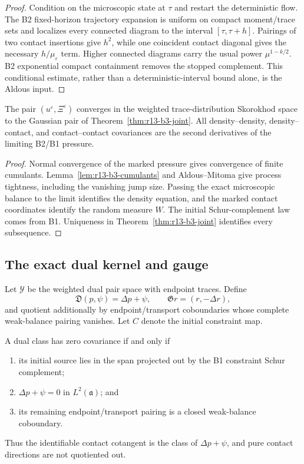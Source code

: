 \begin{proof}
Condition on the microscopic state at $\tau$ and restart the deterministic
flow.  The B2 fixed-horizon trajectory expansion is uniform on compact
moment/trace sets and localizes every connected diagram to the interval
$[\tau,\tau+h]$.  Pairings of two contact insertions give $h^2$, while one
coincident contact diagonal gives the necessary $h/\mu_\varepsilon$ term.
Higher connected diagrams carry the usual power
$\mu^{1-k/2}$.  B2 exponential compact containment removes the stopped
complement.  This conditional estimate, rather than a deterministic-interval
bound alone, is the Aldous input.
\end{proof}

\begin{theorem}
\label{thm:r13-b3-process}
The pair $(u^\varepsilon,\Xi^\varepsilon)$ converges in the weighted
trace-distribution Skorokhod space to the Gaussian pair of
Theorem~\ref{thm:r13-b3-joint}.  All density--density, density--contact, and
contact--contact covariances are the second derivatives of the limiting B2/B1
pressure.
\end{theorem}

\begin{proof}
Normal convergence of the marked pressure gives convergence of finite
cumulants.  Lemma~\ref{lem:r13-b3-cumulants} and Aldous--Mitoma give process
tightness, including the vanishing jump size.  Passing the exact microscopic
balance to the limit identifies the density equation, and the marked contact
coordinates identify the random measure $W$.  The initial Schur-complement
law comes from B1.  Uniqueness in
Theorem~\ref{thm:r13-b3-joint} identifies every subsequence.
\end{proof}

\subsection{The exact dual kernel and gauge}

Let $\mathcal Y$ be the weighted dual pair space with endpoint traces.  Define
\[
 \mathfrak D(p,\psi)=\Delta p+\psi,
 \qquad
 \mathfrak G r=(r,-\Delta r),
\]
and quotient additionally by endpoint/transport coboundaries whose complete
weak-balance pairing vanishes.  Let $C$ denote the initial constraint map.

\begin{theorem}
\label{thm:r13-b3-kernel}
A dual class has zero covariance if and only if
\begin{enumerate}[label=(\roman*)]
\item its initial source lies in the span projected out by the B1 constraint
      Schur complement;
\item $\Delta p+\psi=0$ in $L^2(\mathfrak a)$; and
\item its remaining endpoint/transport pairing is a closed weak-balance
      coboundary.
\end{enumerate}
Thus the identifiable contact cotangent is the class of
$\Delta p+\psi$, and pure contact directions are not quotiented out.
\end{theorem}

